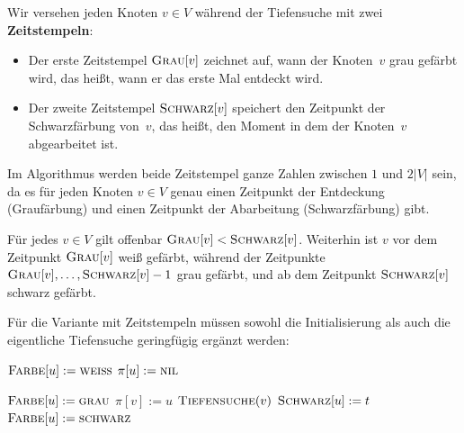 \begin{bem}
Wir versehen jeden Knoten $v \in V$ während der Tiefensuche mit zwei \textbf{Zeitstempeln}:
\begin{itemize}
 \item Der erste Zeitstempel $\mathop{\text{\textsc{Grau}}}[v]$ zeichnet auf, wann der Knoten~$v$ grau gefärbt wird, das heißt, wann er das erste Mal entdeckt wird.
 \item Der zweite Zeitstempel $\mathop{\text{\textsc{Schwarz}}}[v]$ speichert den Zeitpunkt der Schwarzfärbung von~$v$, das heißt, den Moment in dem der Knoten~$v$ abgearbeitet ist.
\end{itemize}
%
\noindent Im Algorithmus werden beide Zeitstempel ganze Zahlen zwischen $1$ und $2 |V|$ sein, da es für jeden Knoten $v \in V$ genau einen Zeitpunkt der Entdeckung (Graufärbung) und einen Zeitpunkt der Abarbeitung (Schwarzfärbung) gibt.

Für jedes $v \in V$ gilt offenbar $\mathop{\text{\textsc{Grau}}}[v] < \mathop{\text{\textsc{Schwarz}}}[v]$.
Weiterhin ist $v$ vor dem Zeitpunkt $\mathop{\text{\textsc{Grau}}}[v]$ weiß gefärbt, während der Zeitpunkte $\mathop{\text{\textsc{Grau}}}[v],\ldots,\mathop{\text{\textsc{Schwarz}}}[v]-1$ grau gefärbt, und ab dem Zeitpunkt $\mathop{\text{\textsc{Schwarz}}}[v]$ schwarz gefärbt.

Für die Variante mit Zeitstempeln müssen sowohl die Initialisierung als auch die eigentliche Tiefensuche geringfügig ergänzt werden:

\begin{algorithm} 
\caption{$\cc{Tiefensuche-Initialisieren}(D)$}
\begin{algorithmic}[1]
  \STATE $\mathop{\text{\textsc{Farbe}}}[u]:=\mathop{\text{\textsc{weiß}}}$
  \STATE $\pi[u]:=\mathop{\text{\textsc{nil}}}$
 \ENDFOR
\end{algorithmic}
\end{algorithm} 

\condclearpage

\begin{algorithm}[H]
	\caption{$\cc{Tiefensuche}(u)$}
	\begin{algorithmic}[1]
		\STATE $\mathop{\text{\textsc{Farbe}}}[u]:=\mathop{\text{\textsc{grau}}}$
		 \STATE $\pi[v]:=u$  
		\STATE $\mathop{\text{\textsc{Tiefensuche}}}(v)$
		\ENDIF
		\ENDFOR
		\STATE\label{line:schwarzfaerbung-in-tiefensuche} {\color{blue} $\mathop{\text{\textsc{Schwarz}}}[u] := t$ $\quad$ }
		\STATE $\mathop{\text{\textsc{Farbe}}}[u]:=\mathop{\text{\textsc{schwarz}}}$
	\end{algorithmic}
\end{algorithm}
\end{bem}


